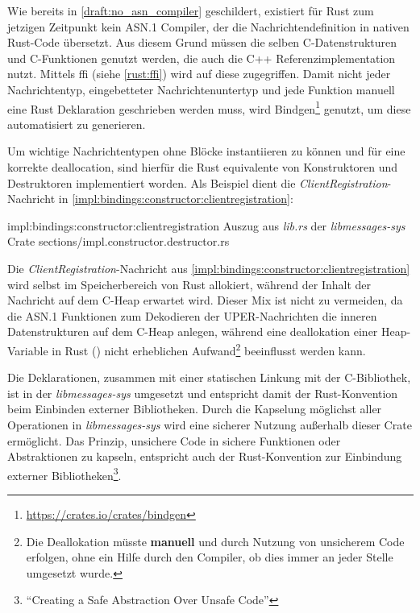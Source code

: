 Wie bereits in \autoref{draft:no_asn_compiler} geschildert, existiert für Rust zum jetzigen Zeitpunkt kein ASN.1 Compiler, der die Nachrichtendefinition in nativen Rust-Code übersetzt.
Aus diesem Grund müssen die selben C-Datenstrukturen und C-Funktionen genutzt werden, die auch die C++ Referenzimplementation nutzt.
Mittels \gls{ffi} (siehe \autoref{rust:ffi}) wird auf diese zugegriffen.
Damit nicht jeder Nachrichtentyp, eingebetteter Nachrichtenuntertyp und jede Funktion manuell eine Rust Deklaration geschrieben werden muss, wird Bindgen\footnote{\url{https://crates.io/crates/bindgen}} genutzt, um diese automatisiert zu generieren.

Um wichtige Nachrichtentypen ohne  Blöcke instantiieren zu können und für eine korrekte deallocation, sind hierfür die Rust equivalente von Konstruktoren und Destruktoren implementiert worden.
Als Beispiel dient die \textit{ClientRegistration}-Nachricht in \autoref{impl:bindings:constructor:clientregistration}:


\rustcinclude
	{impl:bindings:constructor:clientregistration}
	{Auszug aus \textit{lib.rs} der \textit{libmessages-sys} Crate}
	{sections/impl.constructor.destructor.rs}
	
Die \textit{ClientRegistration}-Nachricht aus \autoref{impl:bindings:constructor:clientregistration} wird selbst im Speicherbereich von Rust allokiert, während der Inhalt der Nachricht auf dem C-Heap erwartet wird.
Dieser Mix ist nicht zu vermeiden, da die ASN.1 Funktionen zum Dekodieren der UPER-Nachrichten die inneren Datenstrukturen auf dem C-Heap anlegen, während eine deallokation einer Heap-Variable in Rust () nicht erheblichen Aufwand\footnote{Die Deallokation müsste \textbf{manuell} und durch Nutzung von unsicherem Code erfolgen, ohne ein Hilfe durch den Compiler, ob dies immer an jeder Stelle umgesetzt wurde.} beeinflusst werden kann.

Die Deklarationen, zusammen mit einer statischen Linkung mit der C-Bibliothek, ist in der \textit{libmessages-sys} umgesetzt und entspricht damit der Rust-Konvention beim Einbinden externer Bibliotheken\cite{rust:cargo:build_scripts}.
Durch die Kapselung möglichst aller  Operationen in \textit{libmessages-sys} wird eine sicherer Nutzung außerhalb dieser Crate ermöglicht.
Das Prinzip, unsichere Code in sichere Funktionen oder Abstraktionen zu kapseln, entspricht auch der Rust-Konvention zur Einbindung externer Bibliotheken\footnote{\enquote{Creating a Safe Abstraction Over Unsafe Code}}\cite{rust:book:unsafe}.



